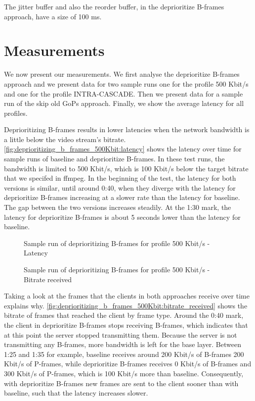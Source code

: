 The jitter buffer and also the reorder buffer, in the deprioritize B-frames approach, have a size of 100 ms.

\section{Measurements}
We now present our measurements. We first analyse the deprioritize B-frames approach and we present data for two sample runs
one for the profile 500 Kbit/s and one for the profile INTRA-CASCADE. Then we present data for a sample run of the skip old
GoPs approach. Finally, we show the average latency for all profiles. 

Deprioritizing B-frames results in lower latencies when the network bandwidth is a little below the video stream's
bitrate. \autoref{fig:deprioritizing_b_frames_500Kbit:latency} shows the latency over time for sample runs of baseline and
deprioritize B-frames. In these test runs, the bandwidth is limited to 500 Kbit/s, which is 100 Kbit/s below the
target bitrate that we specifed in ffmpeg. In the beginning of the test, the latency for both versions is similar,
until around 0:40, when they diverge with the latency for deprioritize B-frames increasing at a slower rate than
the latency for baseline. The gap between the two versions increases steadily. At the 1:30 mark, the latency for 
deprioritize B-frames is about 5 seconds lower than the latency for baseline.

\begin{figure}
    \centering
    
    \caption{Sample run of deprioritizing B-frames for profile 500 Kbit/s - Latency}
    \label{fig:deprioritizing_b_frames_500Kbit:latency}
\end{figure}

\begin{figure}
    \centering
    
    \caption{Sample run of deprioritizing B-frames for profile 500 Kbit/s - Bitrate received}
    \label{fig:deprioritizing_b_frames_500Kbit:bitrate_received}
\end{figure}

Taking a look at the frames that the clients in both approaches receive over time explains why.
\autoref{fig:deprioritizing_b_frames_500Kbit:bitrate_received} shows the bitrate of frames that reached the client
by frame type. Around the 0:40 mark, the client in deprioritize B-frames stops receiving B-frames,
which indicates that at this point the server stopped transmitting them. Because the server is not transmitting any
B-frames, more bandwidth is left for the base layer. Between 1:25
and 1:35 for example, baseline receives around 200 Kbit/s of B-frames 200 Kbit/s of P-frames, while deprioritize
B-frames receives 0 Kbit/s of B-frames and 300 Kbit/s of P-frames, which is 100 Kbit/s more than baseline.
Consequently, with deprioritize B-frames new frames are sent to the client sooner than with baseline,
such that the latency increases slower.

